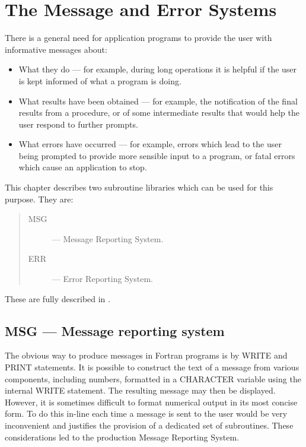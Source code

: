 \chapter{The Message and Error Systems}
\label{C_messerrs}

There is a general need for application programs to provide the user with
informative messages about:

\begin {itemize}
\item What they do --- for example, during long operations it is helpful if the
 user is kept informed of what a program is doing.
\item What results have been obtained --- for example, the notification of  the
 final results from a procedure, or of some intermediate results that would help
 the user respond to further prompts.
\item What errors have occurred --- for example, errors which lead to the user
 being prompted to provide more sensible input to a program, or fatal errors
 which cause an application to stop.
\end {itemize}

This chapter describes two subroutine libraries which can be used for this
purpose.
They are:

\begin{quote}
\begin{description}
\item [MSG] --- Message Reporting System.
\item [ERR] --- Error Reporting System.
\end{description}
\end{quote}

These are fully described in .

\section {MSG --- Message reporting system}

The obvious way to produce messages in Fortran programs is by WRITE and PRINT
statements.
It is possible to construct the text of a message from various components,
including numbers, formatted in a CHARACTER variable using the internal WRITE
statement.
The resulting message may then be displayed.
However, it is sometimes difficult to format numerical output in its most
concise form.
To do this in-line each time a message is sent to the user would be very
inconvenient and justifies the provision of a dedicated set of subroutines.
These considerations led to the production Message Reporting System.

